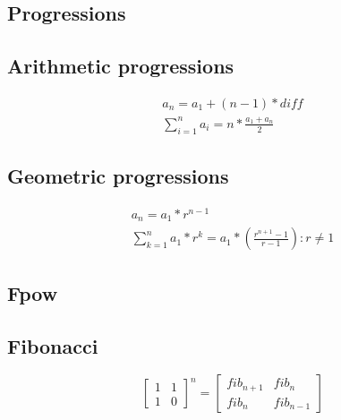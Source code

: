 
\subsection{Progressions}
\vspace{-10pt}
\subsection*{Arithmetic progressions}
\vspace{-10pt}
\begin{gather*}
a_n = a_1 + (n - 1) * diff \\
\sum_{i = 1}^n a_i = n * \frac{a_1 + a_n}{2} 
\end{gather*}
\vspace{-25pt}

\subsection*{Geometric progressions}
\vspace{-10pt}
\begin{gather*}
a_n = a_1 * r^{n - 1} \\
\sum_{k = 1}^{n} a_{1} * r^k = a_1 * \left( \frac{r^{n + 1} - 1}{r - 1} \right): r \neq 1
\end{gather*}
\vspace{-30pt}


\subsection{Fpow}

\subsection{Fibonacci}
\[
\begin{bmatrix}
    1  &  1      \\
    1  &  0      
\end{bmatrix}^{n}
= 
\begin{bmatrix}
    fib_{n+1}  &  fib_{n}      \\
    fib_{n}  &  fib_{n-1}      
\end{bmatrix} 
\]


